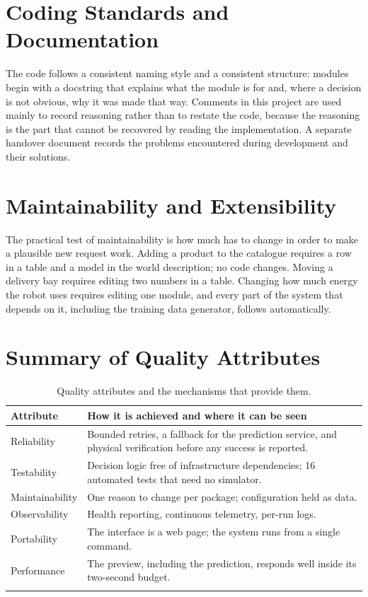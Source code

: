 \documentclass[12pt,a4paper]{report}
\begin{document}
\section{Coding Standards and Documentation}
The code follows a consistent naming style and a consistent structure: modules begin with a
docstring that explains what the module is for and, where a decision is not obvious, why it was
made that way. Comments in this project are used mainly to record reasoning rather than to restate
the code, because the reasoning is the part that cannot be recovered by reading the implementation.
A separate handover document records the problems encountered during development and their
solutions.

\section{Maintainability and Extensibility}
The practical test of maintainability is how much has to change in order to make a plausible new
request work. Adding a product to the catalogue requires a row in a table and a model in the world
description; no code changes. Moving a delivery bay requires editing two numbers in a table.
Changing how much energy the robot uses requires editing one module, and every part of the system
that depends on it, including the training data generator, follows automatically.

\section{Summary of Quality Attributes}

\begin{longtable}{@{}p{}p{}@{}}
\toprule
\textbf{Attribute} & \textbf{How it is achieved and where it can be seen} \\
\midrule
\endhead
Reliability & Bounded retries, a fallback for the prediction service, and physical verification
before any success is reported. \\
Testability & Decision logic free of infrastructure dependencies; 16 automated tests that need no
simulator. \\
Maintainability & One reason to change per package; configuration held as data. \\
Observability & Health reporting, continuous telemetry, per-run logs. \\
Portability & The interface is a web page; the system runs from a single command. \\
Performance & The preview, including the prediction, responds well inside its two-second budget. \\
\bottomrule
\caption{Quality attributes and the mechanisms that provide them.}
\label{tab:quality}
\end{longtable}
\end{document}
